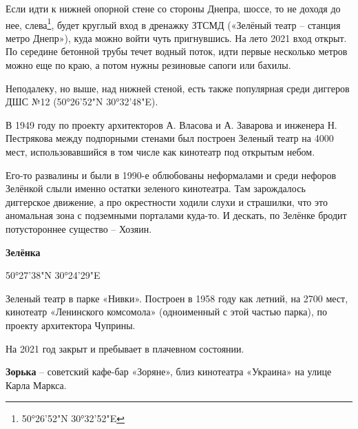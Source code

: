 Если идти к нижней опорной стене со стороны Днепра, шоссе, то не доходя до нее, слева\footnote{ 50°26'52"N 30°32'52"E}, будет круглый вход в дренажку ЗТСМД («Зелёный театр – станция метро Днепр»), куда можно войти чуть пригнувшись. На лето 2021 вход открыт. По середине бетонной трубы течет водный поток, идти первые несколько метров можно еще по краю, а потом нужны резиновые сапоги или бахилы.

Неподалеку, но выше, над нижней стеной, есть также популярная среди диггеров ДШС №12 (50°26'52"N 30°32'48"E).

В 1949 году по проекту архитекторов А. Власова и А. Заварова и инженера Н. Пестрякова между подпорными стенами был построен Зеленый театр на 4000 мест, использовавшийся в том числе как кинотеатр под открытым небом.

Его-то развалины и были в 1990-е облюбованы неформалами и среди нефоров Зелёнкой слыли именно остатки зеленого кинотеатра. Там зарождалось диггерское движение, а про окрестности ходили слухи и страшилки, что это аномальная зона с подземными порталами куда-то. И дескать, по Зелёнке бродит потустороннее существо – Хозяин.\\


\medskip

\textbf{Зелёнка}

50°27'38"N 30°24'29"E

Зеленый театр в парке «Нивки». Построен в 1958 году как летний, на 2700 мест, кинотеатр «Ленинского комсомола» (одноименный с этой частью парка), по проекту архитектора Чуприны.

На 2021 год закрыт и пребывает в плачевном состоянии.\\

\medskip

\textbf{Зорька} – советский кафе-бар «Зоряне», близ кинотеатра «Украина» на улице Карла Маркса.\\